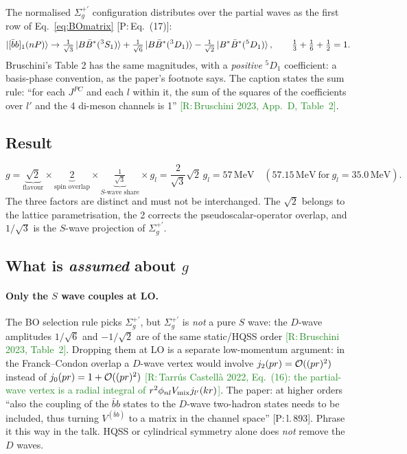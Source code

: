 \documentclass[11pt,a4paper]{article}
\newcommand{\tagP}[1]{\textcolor{blue!65!black}{\textsf{\small[P:\,#1]}}}
\newcommand{\tagR}[1]{\textcolor{ForestGreen}{\textsf{\small[R:\,#1]}}}
\newcommand{\BBst}{B\bar B^*}
\newcommand{\BstBst}{B^*\bar B^*}
\newcommand{\VQQ}{V^{(\bar bb)}}
\newcommand{\bbnP}{[\bar bb]_1(nP)}
\newcommand{\MeV}{\,\mathrm{MeV}}
\begin{document}
The normalised $\Sigma_g^{+\prime}$ configuration distributes over the partial waves as the first row of Eq.~\eqref{eq:BOmatrix} \tagP{Eq.~(17)}:
\begin{equation}
\ket{\bbnP}\to\tfrac{1}{\sqrt3}\ket{\BBst(^3S_1)}+\tfrac{1}{\sqrt6}\ket{\BBst(^3D_1)}-\tfrac{1}{\sqrt2}\ket{\BstBst(^5D_1)},\qquad\tfrac13+\tfrac16+\tfrac12=1 .
\end{equation}
Bruschini's Table 2 has the same magnitudes, with a \emph{positive} $^5D_1$ coefficient: a basis-phase convention, as the paper's footnote says. The caption states the sum rule: ``for each $J^{PC}$ and each $l$ within it, the sum of the squares of the coefficients over $l'$ and the 4 di-meson channels is 1'' \tagR{Bruschini 2023, App.~D, Table~2}.

\subsection{Result}

\begin{keybox}
\begin{equation}
g=\underbrace{\sqrt2}_{\text{flavour}}\times\underbrace{2}_{\text{spin overlap}}\times\underbrace{\tfrac{1}{\sqrt3}}_{S\text{-wave share}}\times g_l=\frac{2}{\sqrt3}\sqrt2\,g_l=57\MeV\quad(57.15\MeV\ \text{for}\ g_l=35.0\MeV).
\end{equation}
The three factors are distinct and must not be interchanged. The $\sqrt2$ belongs to the lattice parametrisation, the 2 corrects the pseudoscalar-operator overlap, and $1/\sqrt3$ is the $S$-wave projection of $\Sigma_g^{+\prime}$.
\end{keybox}

\subsection{What is \emph{assumed} about $g$}
\label{sec:gassump}

\paragraph{Only the $S$ wave couples at LO.} The BO selection rule picks $\Sigma_g^{+\prime}$, but $\Sigma_g^{+\prime}$ is \emph{not} a pure $S$ wave: the $D$-wave amplitudes $1/\sqrt6$ and $-1/\sqrt2$ are of the same static/HQSS order \tagR{Bruschini 2023, Table~2}. Dropping them at LO is a separate low-momentum argument: in the Franck--Condon overlap a $D$-wave vertex would involve $j_2(pr)={\cal O}((pr)^2)$ instead of $j_0(pr)=1+{\cal O}((pr)^2)$ \tagR{Tarr\'us Castell\`a 2022, Eq.~(16): the partial-wave vertex is a radial integral of $r^2\phi_{nl}V_{\rm mix}j_{l'}(kr)$}. The paper: at higher orders ``also the coupling of the $\bar bb$ states to the $D$-wave two-hadron states needs to be included, thus turning $\VQQ$ to a matrix in the channel space'' \tagP{l.\,893}. Phrase it this way in the talk. HQSS or cylindrical symmetry alone does \emph{not} remove the $D$ waves.
\end{document}
